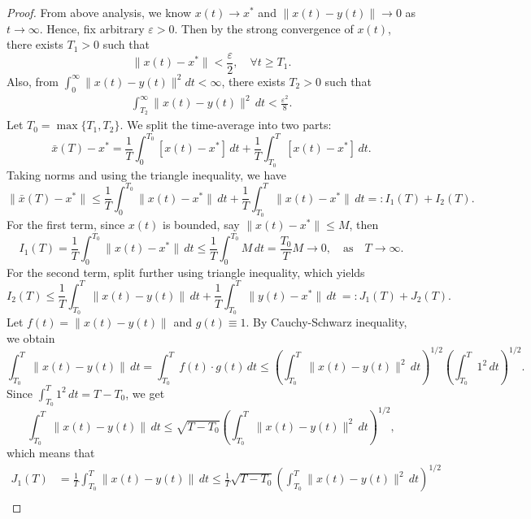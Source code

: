 \documentclass[hidelinks,11 pt]{article}
\numberwithin{equation}{section}
\theoremstyle{definition}  %
\numberwithin{equation}{section}
\numberwithin{theorem}{section}
\begin{document}
\begin{proof}
From above analysis, we know $x(t)\to x^*$ and $\|x(t)-y(t)\|\to 0$ as $t\to\infty$. Hence, fix arbitrary $\varepsilon>0$. Then by the strong convergence of $x(t)$, there exists $T_1>0$ such that
\begin{equation*}
        \|x(t)-x^*\|<\frac{\varepsilon}{2}, \quad \forall t\ge T_1. 
\end{equation*}
Also, from $\int_0^{\infty}\|x(t)-y(t)\|^2dt<\infty$, there exists $T_2>0$ such that 
\begin{align*}
    \int_{T_2}^{\infty}\|x(t)-y(t)\|^2\,dt<\frac{\varepsilon^2}{8}.
\end{align*}
Let $T_0=\max\{T_1,T_2\}$. We split the time-average into two parts:  
\begin{equation*}
    \bar{x}(T)-x^* = \frac{1}{T} \int_0^{T_0} [x(t)-x^*]\,dt + \frac{1}
{T} \int_{T_0}^{T} [x(t)-x^*]\,dt. 
\end{equation*}
Taking norms and using the triangle inequality, we have 
\begin{equation*}
       \| \bar{x}(T)-x^*\|\leq \frac{1}{T} \int_0^{T_0} \|x(t)-x^*\|\,dt + \frac{1}
{T} \int_{T_0}^{T} \|x(t)-x^*\|\,dt =: I_{1}(T)+I_{2}(T). 
\end{equation*}
For the first term, since $x(t)$ is bounded, say $\|x(t)-x^*\|\le M$, then 
\begin{equation*}
    I_{1}(T) = \frac{1}{T} \int_0^{T_0} \|x(t)-x^*\|\,dt\leq \frac{1}{T} \int_0^{T_0} M\,dt=\frac{T_{0}}{T}M\to 0, \quad \text{as}\quad T\to\infty.
\end{equation*}
For the second term, split further using triangle inequality, which yields 
\begin{equation*}
     I_2(T) \le \frac{1}{T} \int_{T_0}^T \|x(t)-y(t)\|\,dt + \frac{1}{T} \int_{T_0}^T \|y(t)-x^*\|\,dt \ =: J_1(T) + J_2(T). 
\end{equation*}
Let \( f(t) = \|x(t) - y(t)\| \) and \( g(t) \equiv 1 \). By Cauchy-Schwarz inequality, we obtain 
\[
\int_{T_0}^T \|x(t) - y(t)\|\,dt = \int_{T_0}^T f(t)\cdot g(t)\,dt \le 
\left( \int_{T_0}^T \|x(t) - y(t)\|^2\,dt \right)^{1/2}
\left( \int_{T_0}^T 1^2\,dt \right)^{1/2}.
\]
Since \( \int_{T_0}^T 1^2\,dt = T - T_0 \), we get 
\[
\int_{T_0}^T \|x(t) - y(t)\|\,dt \le \sqrt{T - T_0} \left( \int_{T_0}^T \|x(t) - y(t)\|^2\,dt \right)^{1/2}, 
\]
which means that 
\begin{align*}
    J_{1}(T) &=  \frac{1}{T}\int_{T_0}^T \|x(t) - y(t)\|\,dt\leq  \frac{1}{T} \sqrt{T - T_0} \left( \int_{T_0}^T \|x(t) - y(t)\|^2\,dt \right)^{1/2}\\

\end{align*}
\end{proof}
\end{document}
